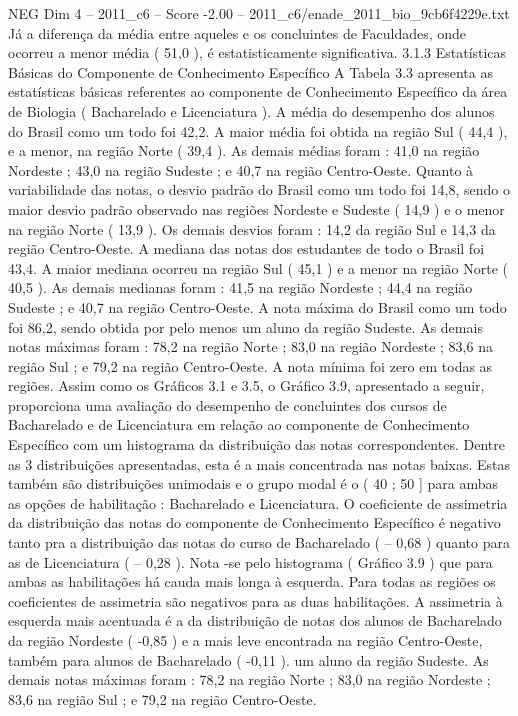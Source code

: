 \begin{textsample}{NEG Dim 4 – 2011\_c6 – Score -2.00 – 2011\_c6/enade\_2011\_bio\_9cb6f4229e.txt}
Já a diferença da média entre aqueles e os concluintes de Faculdades, onde ocorreu a menor média ( 51,0 ), é estatisticamente significativa. 3.1.3 Estatísticas Básicas do Componente de Conhecimento Específico A Tabela 3.3 apresenta as estatísticas básicas referentes ao componente de Conhecimento Específico da área de Biologia ( Bacharelado e Licenciatura ).
A média do desempenho dos alunos do Brasil como um todo foi 42,2.
A maior média foi obtida na região Sul ( 44,4 ), e a menor, na região Norte ( 39,4 ).
As demais médias foram : 41,0 na região Nordeste ; 43,0 na região Sudeste ; e 40,7 na região Centro-Oeste.
Quanto à variabilidade das notas, o desvio padrão do Brasil como um todo foi 14,8, sendo o maior desvio padrão observado nas regiões Nordeste e Sudeste ( 14,9 ) e o menor na região Norte ( 13,9 ).
Os demais desvios foram : 14,2 da região Sul e 14,3 da região Centro-Oeste.
A mediana das notas dos estudantes de todo o Brasil foi 43,4.
A maior mediana ocorreu na região Sul ( 45,1 ) e a menor na região Norte ( 40,5 ).
As demais medianas foram : 41,5 na região Nordeste ; 44,4 na região Sudeste ; e 40,7 na região Centro-Oeste.
A nota máxima do Brasil como um todo foi 86,2, sendo obtida por pelo menos um aluno da região Sudeste.
As demais notas máximas foram : 78,2 na região Norte ; 83,0 na região Nordeste ; 83,6 na região Sul ; e 79,2 na região Centro-Oeste.
A nota mínima foi zero em todas as regiões.
Assim como os Gráficos 3.1 e 3.5, o Gráfico 3.9, apresentado a seguir, proporciona uma avaliação do desempenho de concluintes dos cursos de Bacharelado e de Licenciatura em relação ao componente de Conhecimento Específico com um histograma da distribuição das notas correspondentes.
Dentre as 3 distribuições apresentadas, esta é a mais concentrada nas notas baixas.
Estas também são distribuições unimodais e o grupo modal é o ( 40 ; 50 ] para ambas as opções de habilitação : Bacharelado e Licenciatura.
O coeficiente de assimetria da distribuição das notas do componente de Conhecimento Específico é negativo tanto pra a distribuição das notas do curso de Bacharelado ( – 0,68 ) quanto para as de Licenciatura ( – 0,28 ).
Nota -se pelo histograma ( Gráfico 3.9 ) que para ambas as habilitações há cauda mais longa à esquerda.
Para todas as regiões os coeficientes de assimetria são negativos para as duas habilitações.
A assimetria à esquerda mais acentuada é a da distribuição de notas dos alunos de Bacharelado da região Nordeste ( -0,85 ) e a mais leve encontrada na região Centro-Oeste, também para alunos de Bacharelado ( -0,11 ). um aluno da região Sudeste.
As demais notas máximas foram : 78,2 na região Norte ; 83,0 na região Nordeste ; 83,6 na região Sul ; e 79,2 na região Centro-Oeste.

\end{textsample}
